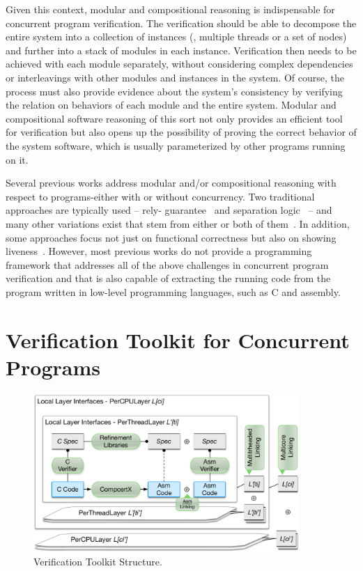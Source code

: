 Given this context, modular and compositional reasoning is indispensable for concurrent program verification. 
The verification should be able to decompose the entire system into a collection of instances (\ie, multiple threads or a set of nodes) and further into a stack of modules in each instance. 
Verification then needs to be achieved with each module separately, without considering complex dependencies or interleavings with other modules and instances in the system. 
Of course, the process must also provide evidence about the system’s consistency by verifying the relation on behaviors of each module and the entire system. Modular and compositional software reasoning of this sort not only provides an efficient tool for verification but also opens up the possibility of proving the correct behavior of the system software, 
which is usually parameterized by other programs running on it. 

Several previous works address modular and/or compositional reasoning with respect to programs-either with or without concurrency. 
Two traditional approaches are typically used -- rely- guarantee~\cite{jones83}  and separation logic~\cite{ishtiaq01} -- and many other variations exist that stem from either or both of them~\cite{feng07:sagl,vafeiadis:marriage,LRG,fu10:roch,sergey15, lili16,Vafeiadis11mfps, Yang07relsep,
Liang14lics}.
In addition, some approaches focus not just on functional correctness but also on showing liveness~\cite{lili16}. 
However, most previous works do not provide a programming framework that addresses all of the above challenges in concurrent program verification and that is also capable of extracting the running code from the program written in low-level programming languages, such as C and assembly. 

\section{Verification Toolkit for Concurrent Programs}
\label{chapter:introduction:sec:verification-toolkit-for-concurrent-programs}

\begin{figure}
\begin{center}
\includegraphics[width=0.9\textwidth]{figs/introfigures}
\end{center}
\caption{Verification Toolkit Structure.}
\label{chapter:intro:verification-toolkit-structure} 
\end{figure}

